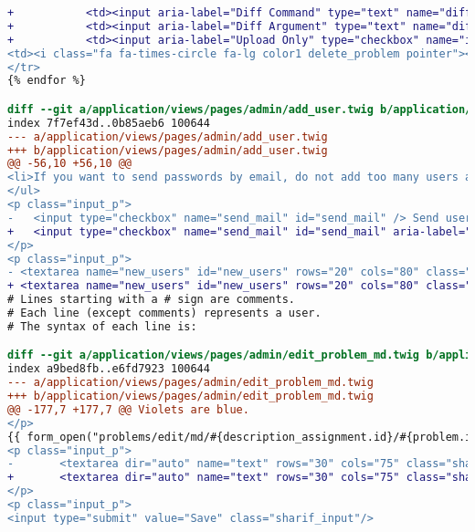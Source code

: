 \begin{itemize}
\begin{lstlisting}[language=diff, caption=Perubahan untuk mematuhi kriteria 1.3.1, label=lst_1.3.1, basicstyle=\ttfamily, frame=single,
columns=fullflexible, keepspaces=true, breaklines=true]
+ 			<td><input aria-label="Diff Command" type="text" name="diff_cmd[]" class="sharif_input tiny" value="{{ problem.diff_cmd }}"/></td>
+ 			<td><input aria-label="Diff Argument" type="text" name="diff_arg[]" class="sharif_input tiny" value="{{ problem.diff_arg }}"/></td>
+ 			<td><input aria-label="Upload Only" type="checkbox" name="is_upload_only[]" class="check" value="{{ problem.id }}" {{ problem.is_upload_only ? 'checked' }}/></td>
<td><i class="fa fa-times-circle fa-lg color1 delete_problem pointer"></i></td>
</tr>
{% endfor %}

diff --git a/application/views/pages/admin/add_user.twig b/application/views/pages/admin/add_user.twig
index 7f7ef43d..0b85aeb6 100644
--- a/application/views/pages/admin/add_user.twig
+++ b/application/views/pages/admin/add_user.twig
@@ -56,10 +56,10 @@
<li>If you want to send passwords by email, do not add too many users at one time. This may result in mail delivery fail.</li>
</ul>
<p class="input_p">
- 	<input type="checkbox" name="send_mail" id="send_mail" /> Send usernames and passwords by email (Waits <input type="text" name="delay" id="delay" class="sharif_input tiny" value="2"/> second(s) before sending each email, so please be patient).
+ 	<input type="checkbox" name="send_mail" id="send_mail" aria-label="Send mail"/> Send usernames and passwords by email (Waits <input type="text" name="delay" id="delay" class="sharif_input tiny" value="2" aria-label="Delay"/> second(s) before sending each email, so please be patient).
</p>
<p class="input_p">
- <textarea name="new_users" id="new_users" rows="20" cols="80" class="sharif_input">
+ <textarea name="new_users" id="new_users" rows="20" cols="80" class="sharif_input" aria-label="Command for creating new user">
# Lines starting with a # sign are comments.
# Each line (except comments) represents a user.
# The syntax of each line is:

diff --git a/application/views/pages/admin/edit_problem_md.twig b/application/views/pages/admin/edit_problem_md.twig
index a9bed8fb..e6fd7923 100644
--- a/application/views/pages/admin/edit_problem_md.twig
+++ b/application/views/pages/admin/edit_problem_md.twig
@@ -177,7 +177,7 @@ Violets are blue.
</p>
{{ form_open("problems/edit/md/#{description_assignment.id}/#{problem.id}") }}
<p class="input_p">
- 		<textarea dir="auto" name="text" rows="30" cols="75" class="sharif_input" id="md_editor">{{ problem.description }}</textarea>
+ 		<textarea dir="auto" name="text" rows="30" cols="75" class="sharif_input" id="md_editor" aria-label="Markdown Editor">{{ problem.description }}</textarea>
</p>
<p class="input_p">
<input type="submit" value="Save" class="sharif_input"/>


\end{lstlisting}
\end{itemize}
